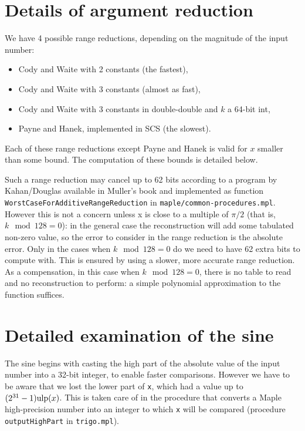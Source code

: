 \section{Details of argument reduction}


We have 4 possible range reductions, depending on the magnitude of the input number:

\begin{itemize}
\item Cody and Waite with 2 constants (the fastest),
\item Cody and Waite with 3 constants (almost as fast),
\item Cody and Waite with 3 constants in double-double and $k$ a
  64-bit int,
\item Payne and Hanek, implemented in SCS (the slowest).
\end{itemize}
Each of these range reductions except Payne and Hanek is valid for $x$
smaller than some bound. The computation of these bounds is detailed
below.

Such a range reduction may cancel up to 62 bits according to a program
by Kahan/Douglas available in Muller's book \cite{Muller97} and
implemented as function \texttt{WorstCaseForAdditiveRangeReduction} in
\texttt{maple/common-procedures.mpl}.  However this is not a concern
unless x is close to a multiple of $\pi/2$ (that is, $k \mod 128=0$): in
the general case the reconstruction will add some tabulated non-zero
value, so the error to consider in the range reduction is the absolute
error.  Only in the cases when $k \mod 128=0$ do we need to have 62
extra bits to compute with. This is ensured by using a slower, more
accurate range reduction. As a compensation, in this case when $k \mod
128=0$, there is no table to read and no reconstruction to perform: a
simple polynomial approximation to the function suffices.






\section{Detailed examination of the sine}

The sine begins with casting the high part of the absolute value of
the input number into a 32-bit integer, to enable faster comparisons.
However we have to be aware that we lost the lower part of \texttt{x},
which had a value up to $(2^{31}-1)\mbox{ulp}(x)$. This is taken care of in
the procedure that converts a Maple high-precision number into an
integer to which \texttt{x} will be compared (procedure
\texttt{outputHighPart} in \texttt{trigo.mpl}).

